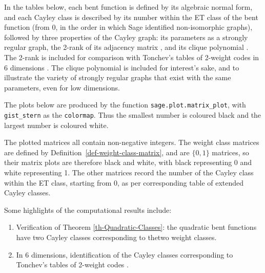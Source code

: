 In the tables below, each bent function is defined by its algebraic normal form, and each Cayley class is described by
its number within the ET class of the bent function (from 0, in the order in which Sage identified non-isomorphic graphs),
followed by three properties of the Cayley graph: its parameters as a strongly regular graph,
the 2-rank of its adjacency matrix \cite{Brov92}, and its clique polynomial \cite{HoeL94}.
The 2-rank is included for comparison with Tonchev's tables of 2-weight codes in 6 dimensions \cite{Ton96uniformly,Ton07codes}.
The clique polynomial is included for interest's sake, and to illustrate the variety of strongly regular graphs
that exist with the same parameters, even for low dimensions.

The plots below are produced by the function \texttt{sage.}\texttt{plot.}\texttt{matrix\_plot},
with \texttt{gist\_stern} as the \texttt{colormap}.
Thus the smallest number is coloured black and the largest number is coloured white.

The plotted matrices all contain non-negative integers.
The weight class matrices are defined by Definition~\ref{def-weight-class-matrix}, and are $\{0,1\}$ matrices,
so their matrix plots are therefore black and white, with black representing 0 and white representing 1.
The other matrices record the number of the Cayley class within the
ET class, starting from 0, as per corresponding table of extended Cayley classes.

Some highlights of the computational results include:
\begin{enumerate}
\item Verification of Theorem \ref{th-Quadratic-Classes}: the quadratic bent functions have two Cayley classes
 corresponding to thetwo weight classes.
\item In 6 dimensions, identification of the Cayley classes corresponding to
Tonchev's tables of 2-weight codes \cite{Ton96uniformly,Ton07codes}.
\end{enumerate}

